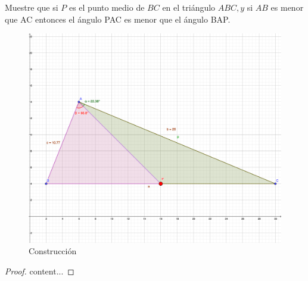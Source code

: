 \begin{problema}
	Muestre que si $P$ es el punto medio de $B C$ en el triángulo $A B C, y$ si $A B$ es menor que AC entonces el ángulo PAC es menor que el ángulo BAP.
\end{problema}

	\begin{figure}[H]
	\centering
	\includegraphics[scale=0.5]{Images/P5.png}
	\caption{Construcción}
\end{figure}

\begin{proof}
	content...
\end{proof}



















